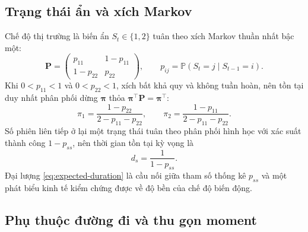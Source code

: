 \documentclass[12pt,a4paper]{article}
\numberwithin{equation}{section}
\theoremstyle{definition}
\newcommand{\Prob}{\mathbb{P}}
\newcommand{\Pmat}{\symbf{P}}
\begin{document}
	\subsection{Trạng thái ẩn và xích Markov}\label{subsec:markov}
	Chế độ thị trường là biến ẩn $S_t\in\{1,2\}$ tuân theo xích Markov thuần nhất bậc một:
	\begin{equation}
		\Pmat=\begin{pmatrix} p_{11} & 1-p_{11}\\ 1-p_{22} & p_{22}\end{pmatrix},
		\qquad p_{ij}=\Prob\!\left(S_t=j\mid S_{t-1}=i\right).
		\label{eq:trans-mat}
	\end{equation}
	Khi $0<p_{11}<1$ và $0<p_{22}<1$, xích bất khả quy và không tuần hoàn, nên tồn tại duy
	nhất phân phối dừng $\symbf\pi$ thỏa $\symbf\pi^{\top}\Pmat=\symbf\pi^{\top}$:
	\begin{equation}
		\pi_1=\frac{1-p_{22}}{2-p_{11}-p_{22}},\qquad
		\pi_2=\frac{1-p_{11}}{2-p_{11}-p_{22}}.
		\label{eq:stationary-markov}
	\end{equation}
	Số phiên liên tiếp ở lại một trạng thái tuân theo phân phối hình học với xác suất thành
	công $1-p_{ss}$, nên thời gian tồn tại kỳ vọng là
	\begin{equation}
		d_s=\frac{1}{1-p_{ss}}.
		\label{eq:expected-duration}
	\end{equation}
	Đại lượng \eqref{eq:expected-duration} là cầu nối giữa tham số thống kê $p_{ss}$ và một
	phát biểu kinh tế kiểm chứng được về độ bền của chế độ biến động.
	
	\subsection{Phụ thuộc đường đi và thu gọn moment}\label{subsec:collapsing}
	
\end{document}

